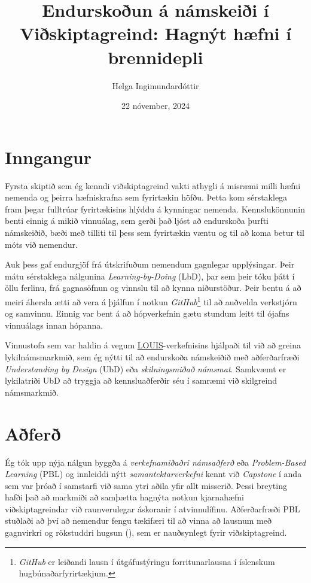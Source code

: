 \documentclass{kennsluakademia_conf}
\date{22 nóvember, 2024}
\title{Endurskoðun á námskeiði í Viðskiptagreind: Hagnýt hæfni í brennidepli}
\author{Helga Ingimundardóttir\autid{}{0000-0002-2780-3546}}
\affil{}{Iðnaðarverkfræðideild, Háskóli Íslands}
\begin{document}
\maketitle


\section{Inngangur}

Fyrsta skiptið sem ég kenndi viðskiptagreind vakti athygli á misræmi milli hæfni nemenda og þeirra hæfniskrafna sem fyrirtækin höfðu. Þetta kom sérstaklega fram þegar fulltrúar fyrirtækisins hlýddu á kynningar nemenda. Kennslukönnunin benti einnig á mikið vinnuálag, sem gerði það ljóst að endurskoða þurfti námskeiðið, bæði með tilliti til þess sem fyrirtækin væntu og til að koma betur til móts við nemendur.

Auk þess gaf endurgjöf frá útskrifuðum nemendum gagnlegar upplýsingar. Þeir mátu sérstaklega nálgunina \textit{Learning-by-Doing} (LbD), þar sem þeir tóku þátt í öllu ferlinu, frá gagnasöfnun og vinnslu til að kynna niðurstöður. Þeir bentu á að meiri áhersla ætti að vera á þjálfun í notkun \textit{GitHub}\footnote{\textit{GitHub} er leiðandi lausn í útgáfustýringu forritunarlausna í íslenskum hugbúnaðarfyrirtækjum.} til að auðvelda verkstjórn og samvinnu. Einnig var bent á að hópverkefnin gætu stundum leitt til ójafns vinnuálags innan hópanna.

Vinnustofa sem var haldin á vegum \href{https://aurora-universities.eu/louis/}{LOUIS}-verkefnisins hjálpaði til við að greina lykilnámsmarkmið, sem ég nýtti til að endurskoða námskeiðið með aðferðarfræði \textit{Understanding by Design} (UbD) eða \textit{skilningsmiðað námsmat}. Samkvæmt \cite{wiggins2005understanding} er lykilatriði UbD að tryggja að kennsluaðferðir séu í samræmi við skilgreind námsmarkmið.

\section{Aðferð}
Ég tók upp nýja nálgun byggða á \textit{verkefnamiðaðri námsaðferð} eða \textit{Problem-Based Learning} (PBL) og innleiddi nýtt \emph{samantektarverkefni} kennt við \textit{Capstone} í anda \cite{capstone} sem var þróað í samstarfi við sama ytri aðila yfir allt misserið. Þessi breyting hafði það að markmiði að samþætta hagnýta notkun kjarnahæfni viðskiptagreindar við raunverulegar áskoranir í atvinnulífinu. Aðferðarfræði PBL stuðlaði að því að nemendur fengu tækifæri til að vinna að lausnum með gagnvirkri og rökstuddri hugsun (\cite{barrows1980problem}), sem er nauðsynlegt fyrir viðskiptagreind.
\end{document}
